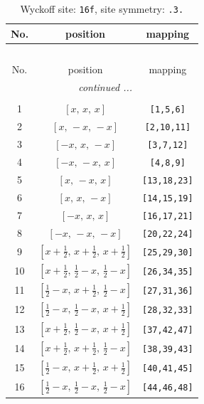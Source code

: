\documentclass[fleqn,8pt]{jsarticle}
\begin{document}
\begin{longtable}{ccc}
\caption{Wyckoff site: {\tt 16f}, site symmetry: {\tt .3.}}
 \\
 \hline \hline
No. & position & mapping \\ \hline \endfirsthead

\multicolumn{2}{l}{\tablename\ \thetable{}} \\
 \hline \hline
No. & position & mapping \\ \hline \endhead

 \hline \hline
\multicolumn{2}{r}{\footnotesize\it continued ...} \\ \endfoot

 \hline \hline
\multicolumn{2}{r}{} \\ \endlastfoot

1 & $\left[ x,\, x,\, x \right]$ & {\tt [1,5,6]} \\ \hline
2 & $\left[ x,\, - x,\, - x \right]$ & {\tt [2,10,11]} \\ \hline
3 & $\left[ - x,\, x,\, - x \right]$ & {\tt [3,7,12]} \\ \hline
4 & $\left[ - x,\, - x,\, x \right]$ & {\tt [4,8,9]} \\ \hline
5 & $\left[ x,\, - x,\, x \right]$ & {\tt [13,18,23]} \\ \hline
6 & $\left[ x,\, x,\, - x \right]$ & {\tt [14,15,19]} \\ \hline
7 & $\left[ - x,\, x,\, x \right]$ & {\tt [16,17,21]} \\ \hline
8 & $\left[ - x,\, - x,\, - x \right]$ & {\tt [20,22,24]} \\ \hline
9 & $\left[ x + \frac{1}{2},\, x + \frac{1}{2},\, x + \frac{1}{2} \right]$ & {\tt [25,29,30]} \\ \hline
10 & $\left[ x + \frac{1}{2},\, \frac{1}{2} - x,\, \frac{1}{2} - x \right]$ & {\tt [26,34,35]} \\ \hline
11 & $\left[ \frac{1}{2} - x,\, x + \frac{1}{2},\, \frac{1}{2} - x \right]$ & {\tt [27,31,36]} \\ \hline
12 & $\left[ \frac{1}{2} - x,\, \frac{1}{2} - x,\, x + \frac{1}{2} \right]$ & {\tt [28,32,33]} \\ \hline
13 & $\left[ x + \frac{1}{2},\, \frac{1}{2} - x,\, x + \frac{1}{2} \right]$ & {\tt [37,42,47]} \\ \hline
14 & $\left[ x + \frac{1}{2},\, x + \frac{1}{2},\, \frac{1}{2} - x \right]$ & {\tt [38,39,43]} \\ \hline
15 & $\left[ \frac{1}{2} - x,\, x + \frac{1}{2},\, x + \frac{1}{2} \right]$ & {\tt [40,41,45]} \\ \hline
16 & $\left[ \frac{1}{2} - x,\, \frac{1}{2} - x,\, \frac{1}{2} - x \right]$ & {\tt [44,46,48]} \\
\end{longtable}
\end{document}
